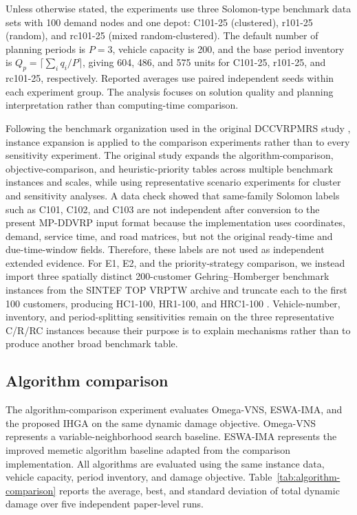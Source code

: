﻿\documentclass[preprint,12pt,authoryear]{elsarticle}
\begin{document}
Unless otherwise stated, the experiments use three Solomon-type benchmark data sets with 100 demand nodes and one depot: C101-25 (clustered), r101-25 (random), and rc101-25 (mixed random-clustered). The default number of planning periods is $P=3$, vehicle capacity is 200, and the base period inventory is $Q_p=\lceil\sum_i q_i/P\rceil$, giving 604, 486, and 575 units for C101-25, r101-25, and rc101-25, respectively. Reported averages use paired independent seeds within each experiment group. The analysis focuses on solution quality and planning interpretation rather than computing-time comparison.

Following the benchmark organization used in the original DCCVRPMRS study \citep{zhao2026routing}, instance expansion is applied to the comparison experiments rather than to every sensitivity experiment. The original study expands the algorithm-comparison, objective-comparison, and heuristic-priority tables across multiple benchmark instances and scales, while using representative scenario experiments for cluster and sensitivity analyses. A data check showed that same-family Solomon labels such as C101, C102, and C103 are not independent after conversion to the present MP-DDVRP input format because the implementation uses coordinates, demand, service time, and road matrices, but not the original ready-time and due-time-window fields. Therefore, these labels are not used as independent extended evidence. For E1, E2, and the priority-strategy comparison, we instead import three spatially distinct 200-customer Gehring--Homberger benchmark instances from the SINTEF TOP VRPTW archive and truncate each to the first 100 customers, producing HC1-100, HR1-100, and HRC1-100 \citep{gehring2001parallel,sintefTopVrptw}. Vehicle-number, inventory, and period-splitting sensitivities remain on the three representative C/R/RC instances because their purpose is to explain mechanisms rather than to produce another broad benchmark table.

\subsection{Algorithm comparison}
\label{subsec:algorithm-comparison}

The algorithm-comparison experiment evaluates Omega-VNS, ESWA-IMA, and the proposed IHGA on the same dynamic damage objective. Omega-VNS represents a variable-neighborhood search baseline. ESWA-IMA represents the improved memetic algorithm baseline adapted from the comparison implementation. All algorithms are evaluated using the same instance data, vehicle capacity, period inventory, and damage objective. Table~\ref{tab:algorithm-comparison} reports the average, best, and standard deviation of total dynamic damage over five independent paper-level runs.
\end{document}
